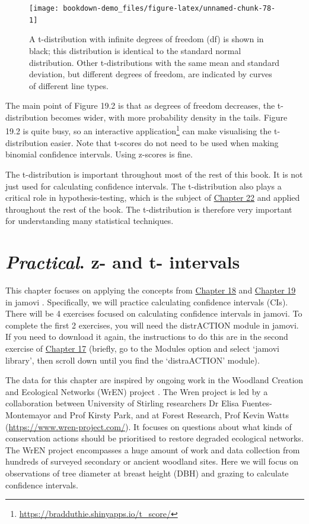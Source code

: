 \documentclass[
  openany]{krantz}
\begin{document}
\begin{figure}
\texttt{[image: bookdown-demo\_files/figure-latex/unnamed-chunk-78-1]} \caption{A t-distribution with infinite degrees of freedom (df) is shown in black; this distribution is identical to the standard normal distribution. Other t-distributions with the same mean and standard deviation, but different degrees of freedom, are indicated by curves of different line types.}\label{fig:unnamed-chunk-78}
\end{figure}

The main point of Figure 19.2 is that as degrees of freedom decreases, the t-distribution becomes wider, with more probability density in the tails.
Figure 19.2 is quite busy, so an interactive application\footnote{\url{https://bradduthie.shinyapps.io/t_score/}} can make visualising the t-distribution easier.
Note that t-scores do not need to be used when making binomial confidence intervals.
Using z-scores is fine.

The t-distribution is important throughout most of the rest of this book.
It is not just used for calculating confidence intervals.
The t-distribution also plays a critical role in hypothesis-testing, which is the subject of \protect\hyperlink{Chapter_22}{Chapter 22} and applied throughout the rest of the book.
The t-distribution is therefore very important for understanding many statistical techniques.

\hypertarget{Chapter_20}{%
\chapter{\texorpdfstring{\emph{Practical}. z- and t- intervals}{Practical. z- and t- intervals}}\label{Chapter_20}}

This chapter focuses on applying the concepts from \protect\hyperlink{Chapter_18}{Chapter 18} and \protect\hyperlink{Chapter_19}{Chapter 19} in jamovi \citep{Jamovi2022}.
Specifically, we will practice calculating confidence intervals (CIs).
There will be 4 exercises focused on calculating confidence intervals in jamovi.
To complete the first 2 exercises, you will need the distrACTION module in jamovi.
If you need to download it again, the instructions to do this are in the second exercise of \protect\hyperlink{Chapter_17}{Chapter 17} (briefly, go to the Modules option and select `jamovi library', then scroll down until you find the `distraACTION' module).

The data for this chapter are inspired by ongoing work in the Woodland Creation and Ecological Networks (WrEN) project \citep{Fuentes-Montemayor2022, Fuentes-Montemayor2022a}.
The Wren project is led by a collaboration between University of Stirling researchers Dr Elisa Fuentes-Montemayor and Prof Kirsty Park, and at Forest Research, Prof Kevin Watts (\url{https://www.wren-project.com/}).
It focuses on questions about what kinds of conservation actions should be prioritised to restore degraded ecological networks.
The WrEN project encompasses a huge amount of work and data collection from hundreds of surveyed secondary or ancient woodland sites.
Here we will focus on observations of tree diameter at breast height (DBH) and grazing to calculate confidence intervals.
\end{document}
